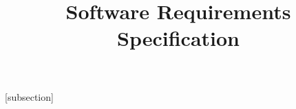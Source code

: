 

[subsection]
\newcommand{\usecasestep}[1]{\stepcounter{usecasestep}\theusecasestep.\:#1}

\newenvironment{usecasetable}
{
   \begin{xltabular}{\textwidth}{X}
}{
   \end{xltabular}
}

\newcommand{\startusecasetable}{\\\hline\endfirsthead\endhead\hspace*{\fill}\textit{Wordt vervolgd op de volgende pagina.} \\\hline\endfoot\endlastfoot}
\newcommand{\nextpart}{\\\hline}

\newcommand{\primaryactor}[1]{\textbf{Primaire actor:} #1}

\newenvironment{stakeholders}
{
   \noindent\begin{minipage}[t]{\linewidth}
      \textbf{Stakeholders en belangen:}
}
{
   \end{minipage}
}

\newenvironment{preconditions}
{
   \noindent\begin{minipage}[t]{\linewidth}
      \textbf{Precondities:}
}{
   \end{minipage}
}

\newenvironment{postconditions}
{
   \noindent\begin{minipage}[t]{\linewidth}
      \textbf{Postconditions:}
}{
   \end{minipage}
}

\newenvironment{basicflow}
{
   \noindent\begin{minipage}[t]{\linewidth}
      \textbf{Succesvol hoofdscenario:}\\
}{
   \end{minipage}
}

\newcommand{\basicflowheading}{\textbf{Actoractie} & \textbf{Systeemverantwoordelijkheid} \\\hline}

\newenvironment{alternativeflows}
{
   \noindent\begin{minipage}[t]{\linewidth}
      \textbf{Alternatieve scenario's:}\\
}{
   \end{minipage}
}

\title{Software Requirements Specification}




